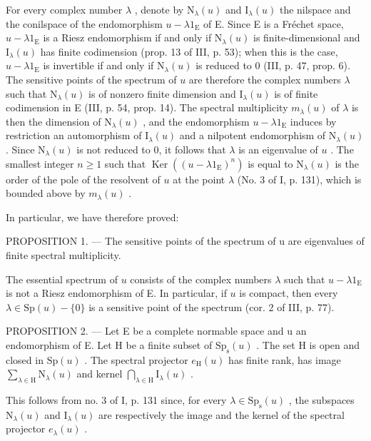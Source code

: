For every complex number \(\lambda\) , denote by \(\mathrm{N}_{\lambda}(u)\) and \(\mathrm{I}_{\lambda}(u)\) the nilspace and the conilspace of the endomorphism \(u - \lambda 1_{\mathrm{E}}\) of E. Since E is a Fréchet space, \(u - \lambda 1_{\mathrm{E}}\) is a Riesz endomorphism if and only if \(\mathrm{N}_{\lambda}(u)\) is finite-dimensional and \(\mathrm{I}_{\lambda}(u)\) has finite codimension (prop. 13 of III, p. 53); when this is the case, \(u - \lambda 1_{\mathrm{E}}\) is invertible if and only if \(\mathrm{N}_{\lambda}(u)\) is reduced to 0 (III, p. 47, prop. 6). The sensitive points of the spectrum of \(u\) are therefore the complex numbers \(\lambda\) such that \(\mathrm{N}_{\lambda}(u)\) is of nonzero finite dimension and \(\mathrm{I}_{\lambda}(u)\) is of finite codimension in E (III, p. 54, prop. 14). The spectral multiplicity \(m_{\lambda}(u)\) of \(\lambda\) is then the dimension of \(\mathrm{N}_{\lambda}(u)\) , and the endomorphism \(u - \lambda 1_{\mathrm{E}}\) induces by restriction an automorphism of \(\mathrm{I}_{\lambda}(u)\) and a nilpotent endomorphism of \(\mathrm{N}_{\lambda}(u)\) . Since \(\mathrm{N}_{\lambda}(u)\) is not reduced to 0, it follows that \(\lambda\) is an eigenvalue of \(u\) . The smallest integer \(n \geqslant 1\) such that \(\operatorname{Ker}((u - \lambda 1_{\mathrm{E}})^n)\) is equal to \(\mathrm{N}_{\lambda}(u)\) is the order of the pole of the resolvent of \(u\) at the point \(\lambda\) (No. 3 of I, p. 131), which is bounded above by \(m_{\lambda}(u)\) .

In particular, we have therefore proved:

PROPOSITION 1. --- The sensitive points of the spectrum of u are eigenvalues of finite spectral multiplicity.

The essential spectrum of \(u\) consists of the complex numbers \(\lambda\) such that \(u - \lambda 1_{\mathrm{E}}\) is not a Riesz endomorphism of E. In particular, if \(u\) is compact, then every \(\lambda \in \mathrm{Sp}(u) - \{0\}\) is a sensitive point of the spectrum (cor. 2 of III, p. 77).

PROPOSITION 2. --- Let E be a complete normable space and u an endomorphism of E. Let H be a finite subset of \(\mathrm{Sp}_{\mathrm{s}}(u)\) . The set H is open and closed in \(\mathrm{Sp}(u)\) . The spectral projector \(e_{\mathrm{H}}(u)\) has finite rank, has image \(\sum_{\lambda \in \mathrm{H}}\mathrm{N}_{\lambda}(u)\) and kernel \(\bigcap_{\lambda \in \mathrm{H}}\mathrm{I}_{\lambda}(u)\) .

This follows from no. 3 of I, p. 131 since, for every \(\lambda \in \mathrm{Sp}_{\mathrm{s}}(u)\) , the subspaces \(\mathrm{N}_{\lambda}(u)\) and \(\mathrm{I}_{\lambda}(u)\) are respectively the image and the kernel of the spectral projector \(e_{\lambda}(u)\) .

